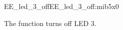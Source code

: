 \begin{function_nopb2}{EE\_led\_3\_off}{EE_led_3_off:mib5x0}
  
  \begin{fundescription}
    The function turns off LED 3.
  \end{fundescription}
  
  
  
\end{function_nopb2}


